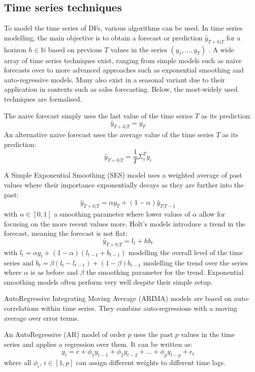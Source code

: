 \subsection{Time series techniques}\label{sec:3b:timeseries}

To model the time series of DFs, various algorithms can be used.
In time series modelling, the main objective is to obtain a forecast or prediction $\hat{y}_{T+h|T}$ for a horizon $h\in \mathbb{N}$ based on previous $T$ values in the series $(y_1,...,y_T)$ \cite{hyndman2018forecasting}.
A wide array of time series techniques exist, ranging from simple models such as naive forecasts over to more advanced approaches such as exponential smoothing and auto-regressive models.
Many also exist in a seasonal variant due to their application in contexts such as sales forecasting.
Below, the most-widely used techniques are formalised.

The naive forecast simply uses the last value of the time series $T$ as its prediction:
\[\hat{y}_{T+h|T}=y_T\]
An alternative naive forecast uses the average value of the time series $T$ as its prediction:
\[\hat{y}_{T+h|T}=\frac{1}{T}\Sigma_i^{T} y_i\]

A Simple Exponential Smoothing (SES) model uses a weighted average of past values where their importance exponentially decays as they are further into the past:
\[\hat{y}_{T+h|T}=\alpha y_T + (1-\alpha)\hat{y}_{T|T-1}\]
with $\alpha \in [0,1]$ a smoothing parameter where lower values of $\alpha$ allow for focusing on the more recent values more.
Holt's models introduce a trend in the forecast, meaning the forecast is not flat:
\[\hat{y}_{T+h|T}=l_t + hb_t\]
with $l_t = \alpha y_t + (1-\alpha)(l_{t-1}+b_{t-1})$ modelling the overall level of the time series and $b_t=\beta(l_t-l_{t-1})+(1-\beta)b_{t-1}$ modelling the trend over the series where $\alpha$ is as before and $\beta$ the smoothing parameter for the trend.
Exponential smoothing models often perform very well despite their simple setup.

AutoRegressive Integrating Moving Average (ARIMA) models are based on auto-correlations within time series. 
They combine auto-regressions with a moving average over error terms.

An AutoRegressive (AR) model of order $p$ uses the past $p$ values in the time series and applies a regression over them. 
It can be written as:
\[y_t=c+\phi_1 y_{t-1} + \phi_2 y_{t-2} + \dots + \phi_p y_{t-p} + \epsilon_t\]
where all $\phi_i,\, i\in[1,p]$ can assign different weights to different time lags.

